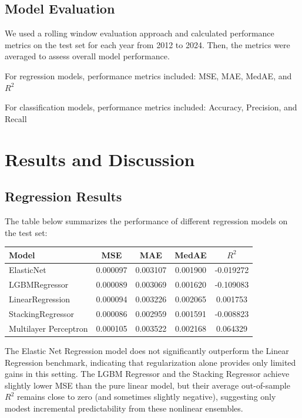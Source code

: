 \documentclass[12pt]{article}
\begin{document}
\subsection{Model Evaluation}

We used a rolling window evaluation approach and calculated performance metrics on the test set for each year from 2012 to 2024. Then, the metrics were averaged to assess overall model performance.

For regression models, performance metrics included: MSE, MAE, MedAE, and $R^2$

For classification models, performance metrics included: Accuracy, Precision, and Recall


\section{Results and Discussion}

\subsection{Regression Results}

The table below summarizes the performance of different regression models on the test set:

\begin{table}[h!]
\centering
\begin{tabular}{lcccc}
\hline
Model & MSE & MAE & MedAE & $R^2$ \\
\hline
ElasticNet        & 0.000097 & 0.003107 & 0.001900 & -0.019272 \\
LGBMRegressor     & 0.000089 & 0.003069 & 0.001620 & -0.109083 \\
LinearRegression  & 0.000094 & 0.003226 & 0.002065 &  0.001753 \\
StackingRegressor & 0.000086 & 0.002959 & 0.001591 & -0.008823 \\
Multilayer Perceptron & 0.000105 & 0.003522 & 0.002168 & 0.064329 \\
\hline
\end{tabular}
\end{table}


The Elastic Net Regression model does not significantly outperform the Linear Regression benchmark, indicating that regularization alone provides only limited gains in this setting. The LGBM Regressor and the Stacking Regressor achieve slightly lower MSE than the pure linear model, but their average out-of-sample $R^2$ remains close to zero (and sometimes slightly negative), suggesting only modest incremental predictability from these nonlinear ensembles.
\end{document}
